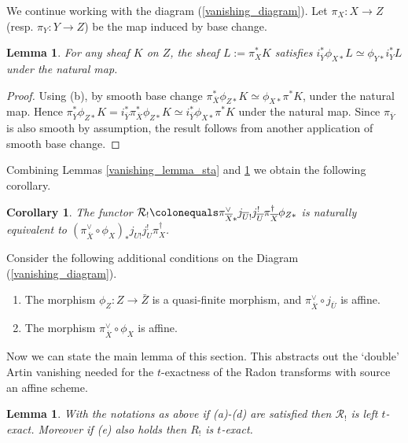 \documentclass[12pt, reqno]{amsart}
\theoremstyle{plain}
\newtheorem{lem}[thm]{\bf Lemma}
\newtheorem{cor}[thm]{\bf Corollary}
\theoremstyle{definition}
\theoremstyle{definition}
\newcommand{\cR}{{\mathcal R}}
\begin{document}
We continue working with the diagram (\ref{vanishing_diagram}). Let $\pi_X :X \to Z$ (resp. $\pi_Y: Y \to Z$) be the map induced by base change.

\begin{lem}\label{vanishing_lem_sta_2}
    For any sheaf $K$ on $Z$, the sheaf $L:=\pi_X^{*}K$ satisfies $i_{\overline{Y}}^*\phi_{X*}L \simeq \phi_{Y*}i^{*}_{Y}L$ under the natural map.
\end{lem}

\begin{proof}
Using (b), by smooth base change $\pi_{\overline{X}}^{*}\phi_{Z*}K \simeq \phi_{X*}\pi^{*}K$, under the natural map. Hence $\pi_{\overline{Y}}^*\phi_{Z*}K=i_{\overline{Y}}^{*}\pi_{\overline{X}}^{*}\phi_{Z*}K \simeq i_{\overline{Y}}^*\phi_{X*}\pi^{*}K$ under the natural map. Since $\pi_{\overline{Y}}$ is also smooth by assumption, the result follows from another application of smooth base change.
\end{proof}

Combining Lemmas \ref{vanishing_lemma_sta} and \ref{vanishing_lem_sta_2} we obtain the following corollary. 

\begin{cor}\label{R_!_description}
The functor $\cR_{!} \colonequals \pi_{\overline{X}*}^{\vee}j_{\overline{U}!}j_{\overline{U}}^!\pi_{\overline{X}}^{\dagger}\phi_{Z*}$ is naturally equivalent to $(\pi_{\overline{X}}^{\vee}\circ \phi_X)_* j_{U!}j_{U}^{!}\pi_X^{\dagger}$.

\end{cor}    

Consider the following additional conditions on the Diagram (\ref{vanishing_diagram}).
\begin{enumerate}
      \item[(d)] The morphism  $\phi_Z: Z \to \bar{Z}$ is a quasi-finite morphism, and  $\pi_{\overline{X}}^{\vee} \circ j_{\overline{U}}$ is affine.
     \item[(e)] The morphism $\pi_{\overline{X}}^{\vee} \circ \phi_X$ is affine.
\end{enumerate}
Now we can state the main lemma of this section. This abstracts out the `double' Artin vanishing needed for the $t$-exactness of the Radon transforms with source an affine scheme.

\begin{lem}\label{criterion_t_exactness_2}
    With the notations as above if (a)-(d) are satisfied then $\cR_{!}$ is left $t$-exact. Moreover if (e) also holds then $R_!$ is $t$-exact.
\end{lem}
\end{document}
